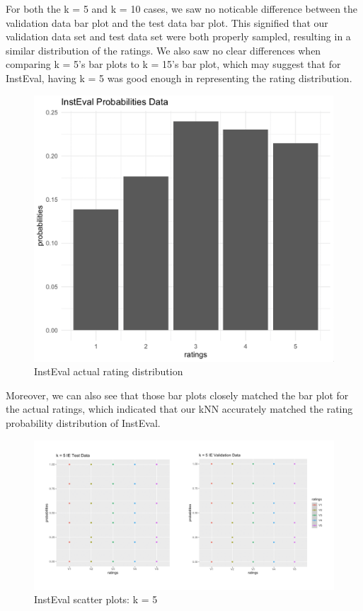 \documentclass{article}
\begin{document}
For both the k = 5 and k = 10 cases, we saw no noticable difference between the validation data bar plot and the test data bar plot. This signified that our validation data set and test data set were both properly sampled, resulting in a similar distribution of the ratings. We also saw no clear differences when comparing k = 5's bar plots to k = 15's bar plot, which may suggest that for InstEval, having k = 5 was good enough in representing the rating distribution. 

\begin{figure}[ht]
\centering
\includegraphics[scale=0.25]{IE Actual Probs.png}
\caption{InstEval actual rating distribution}
\end{figure}

Moreover, we can also see that those bar plots closely matched the bar plot for the actual ratings, which indicated that our kNN accurately matched the rating probability distribution of InstEval.

\begin{figure}[ht]
\centering
\includegraphics[scale=0.35]{k = 5 IE Scatter Plot.png}
\caption{InstEval scatter plots: k = 5}
\end{figure}
\end{document}
